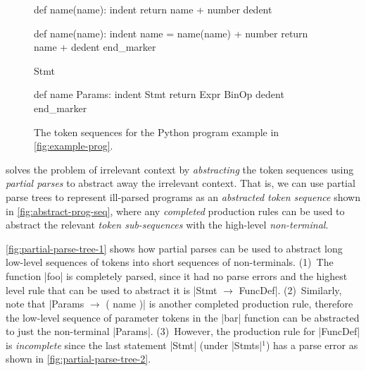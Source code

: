 \begin{figure}[t]
\centering
\begin{minipage}[t]{0.54\linewidth}
\centering
\begin{ecode}
def name(name): \n
indent return name + number \n
dedent \n

def name(name): \n
indent name = name(name) + number \n
return name + \n
dedent end_marker
\end{ecode}
\label{fig:prog-seq}
\end{minipage}%
\hspace{0.02\linewidth}%
\begin{minipage}[t]{0.44\linewidth}
\centering
\begin{ecode}
Stmt \n

def name Params: \n
indent Stmt \n
return Expr BinOp \n
dedent end_marker
\end{ecode}
\label{fig:abstract-prog-seq}
\end{minipage}
\caption{The token sequences for the Python program example in \autoref{fig:example-prog}.}
\end{figure}

%
\toolname solves the problem of irrelevant context by \emph{abstracting} the
token sequences using \emph{partial parses} to abstract away the irrelevant
context.
%
That is, we can use partial parse trees to represent ill-parsed programs as an
\emph{abstracted token sequence} shown in \autoref{fig:abstract-prog-seq}, where
any \emph{completed} production rules can be used to abstract the relevant
\emph{token sub-sequences} with the high-level \emph{non-terminal}.

\autoref{fig:partial-parse-tree-1} shows how partial parses can be used to
abstract long low-level sequences of tokens into short sequences of
non-terminals.
%
(1)~The function |foo| is completely parsed,
since it had no parse errors and the highest
level rule that can be used to abstract it is
%
|Stmt $\rightarrow$ FuncDef|.
%
(2)~Similarly, note that |Params $\rightarrow$ ( name )|
is another completed production rule, therefore the
low-level sequence of  parameter tokens in the |bar|
function can be abstracted to just the non-terminal |Params|.
%
(3)~However, the production rule for |FuncDef| is \emph{incomplete} since the
last statement |Stmt| (under |Stmts|$^1$) has a parse error as shown in
\autoref{fig:partial-parse-tree-2}.

